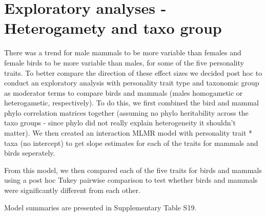 \documentclass[]{article}
\begin{document}
\section{Exploratory analyses - Heterogamety and taxo
group}\label{exploratory-analyses---heterogamety-and-taxo-group}

There was a trend for male mammals to be more variable than females and
female birds to be more variable than males, for some of the five
personality traits. To better compare the direction of these effect
sizes we decided post hoc to conduct an exploratory analysis with
personality trait type and taxonomic group as moderator terms to compare
birds and mammals (males homogametic or heterogametic, respectively). To
do this, we first combined the bird and mammal phylo correlation
matrices together (assuming no phylo heritability across the taxo groups
- since phylo did not really explain heterogeneity it shouldn't matter).
We then created an interaction MLMR model with personality trait * taxa
(no intercept) to get slope estimates for each of the traits for mammals
and birds seperately.

From this model, we then compared each of the five traits for birds and
mammals using a post hoc Tukey pairwise comparison to test whether birds
and mammals were significantly different from each other.

Model summaries are presented in Supplementary Table S19.
\end{document}
